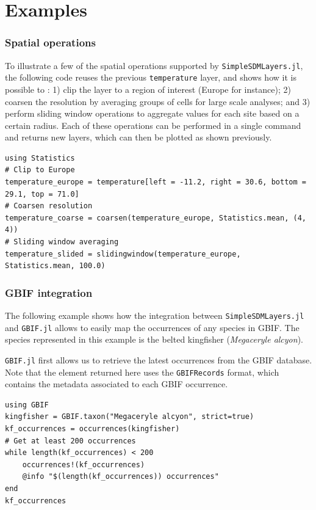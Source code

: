 \documentclass[
]{article}
\begin{document}
\hypertarget{examples}{%
\section{Examples}\label{examples}}

\hypertarget{spatial-operations}{%
\subsubsection{Spatial operations}\label{spatial-operations}}

To illustrate a few of the spatial operations supported by
\texttt{SimpleSDMLayers.jl}, the following code reuses the
previous \texttt{temperature} layer, and shows how it is
possible to : 1) clip the layer to a region of interest (Europe for
instance); 2) coarsen the resolution by averaging groups of cells for
large scale analyses; and 3) perform sliding window operations to
aggregate values for each site based on a certain radius. Each of these
operations can be performed in a single command and returns new layers,
which can then be plotted as shown previously.

\begin{verbatim}
using Statistics
# Clip to Europe
temperature_europe = temperature[left = -11.2, right = 30.6, bottom = 29.1, top = 71.0]
# Coarsen resolution
temperature_coarse = coarsen(temperature_europe, Statistics.mean, (4, 4))
# Sliding window averaging
temperature_slided = slidingwindow(temperature_europe, Statistics.mean, 100.0)
\end{verbatim}

\hypertarget{gbif-integration}{%
\subsubsection{GBIF integration}\label{gbif-integration}}

The following example shows how the integration between
\texttt{SimpleSDMLayers.jl} and \texttt{GBIF.jl}
allows to easily map the occurrences of any species in GBIF. The species
represented in this example is the belted kingfisher (\emph{Megaceryle
alcyon}).

\texttt{GBIF.jl} first allows us to retrieve the latest
occurrences from the GBIF database. Note that the element returned here
uses the \texttt{GBIFRecords} format, which contains the
metadata associated to each GBIF occurrence.

\begin{verbatim}
using GBIF
kingfisher = GBIF.taxon("Megaceryle alcyon", strict=true)
kf_occurrences = occurrences(kingfisher)
# Get at least 200 occurrences
while length(kf_occurrences) < 200
    occurrences!(kf_occurrences)
    @info "$(length(kf_occurrences)) occurrences"
end
kf_occurrences
\end{verbatim}
\end{document}

